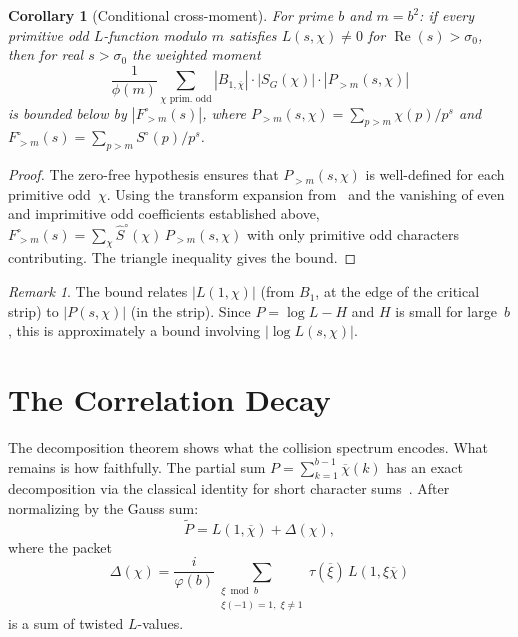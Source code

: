\documentclass[12pt]{amsart}
\newtheorem{corollary}[theorem]{Corollary}
\theoremstyle{definition}
\theoremstyle{remark}
\newtheorem{remark}[theorem]{Remark}
\begin{document}
\begin{corollary}[Conditional cross-moment]
\label{cor:cross}
For prime $b$ and $m = b^2$: if every primitive odd
$L$-function modulo $m$ satisfies
$L(s, \chi) \ne 0$ for
$\operatorname{Re}(s) > \sigma_0$, then for
real $s > \sigma_0$ the weighted moment
\[
\frac{1}{\phi(m)}
\sum_{\chi \text{ prim.\ odd}}
|B_{1,\overline{\chi}}| \cdot |S_G(\chi)|
\cdot |P_{>m}(s,\chi)|
\]
is bounded below by $|F^{\circ}_{>m}(s)|$,
where $P_{>m}(s,\chi) = \sum_{p > m} \chi(p)/p^s$
and $F^{\circ}_{>m}(s) = \sum_{p > m} S^{\circ}(p)/p^s$.
\end{corollary}

\begin{proof}
The zero-free hypothesis ensures that
$P_{>m}(s, \chi)$ is well-defined for each
primitive odd~$\chi$.
Using the transform expansion from~\cite{paperB}
and the vanishing of even and imprimitive odd
coefficients established above,
$F^{\circ}_{>m}(s) = \sum_{\chi}
\hat{S}^{\circ}(\chi)\, P_{>m}(s, \chi)$
with only primitive odd characters contributing.
The triangle inequality gives the bound.
\end{proof}

\begin{remark}
The bound relates $|L(1, \chi)|$ (from $B_1$,
at the edge of the critical strip) to
$|P(s, \chi)|$ (in the strip). Since
$P = \log L - H$ and $H$ is small for large~$b$,
this is approximately a bound involving
$|\log L(s, \chi)|$.
\end{remark}

\section{The Correlation Decay}

The decomposition theorem shows what the collision
spectrum encodes. What remains is how faithfully. The partial sum
$P = \sum_{k=1}^{b-1} \overline{\chi}(k)$ has an
exact decomposition via the classical identity for
short character sums~\cite{berndt,montgomery}. After
normalizing by the Gauss sum:
\[
\widetilde{P} = L(1, \overline{\chi}) + \Delta(\chi),
\]
where the packet
\[
\Delta(\chi) = \frac{i}{\varphi(b)}
\sum_{\substack{\xi \bmod b \\ \xi(-1)=1,\;
\xi \ne 1}} \tau(\overline{\xi})\,
L(1, \xi\overline{\chi})
\]
is a sum of twisted $L$-values.
\end{document}
